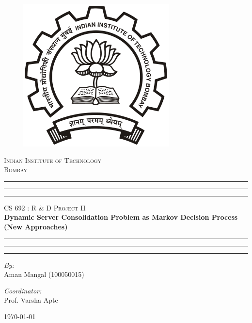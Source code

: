 \begin{titlepage}
\begin{figure}[ht!]
    \begin{center}
		\includegraphics[scale = .4]{images/iitb}
	\end{center}
\end{figure}
\vspace*{-1cm}
\begin{center}
	\textsc{\LARGE Indian Institute of Technology
			\\Bombay} \\[2.5cm]

    \vspace*{1.5cm}
	\hrule \hrule \hrule
	\vspace{0.5cm}	
	\textsc{\Large CS 692 : R \& D Project II}\\[0.5cm]
	{\large \bfseries Dynamic Server Consolidation Problem as Markov Decision Process (New Approaches)} \\[0.5cm]
	\hrule \hrule \hrule
	\vspace{4cm}
	
	\begin{minipage}{0.4\textwidth}
	\begin{flushleft} \large
		\emph{By:} \\
		Aman Mangal (100050015)
	\end{flushleft}
	\end{minipage}
	\begin{minipage}{0.45\textwidth}
	\begin{flushright} \large
		\emph{Coordinator:} \\
		Prof. Varsha Apte
	\end{flushright}
	\end{minipage}
	\vspace{0.5cm}
	
	{\large \today}
\end{center}
\end{titlepage}
